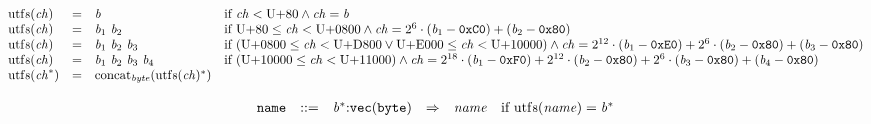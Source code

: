 \vspace{1ex}

$$
\begin{array}{@{}lcl@{}l@{}}
{\mathrm{utf{\scriptstyle8}}}({\mathit{ch}}) &=& {\mathit{b}} &\quad
  \mbox{if}~{\mathit{ch}} < \mathrm{U{+}80} \land {\mathit{ch}} = {\mathit{b}} \\
{\mathrm{utf{\scriptstyle8}}}({\mathit{ch}}) &=& {\mathit{b}}_{{1}}~{\mathit{b}}_{{2}} &\quad
  \mbox{if}~\mathrm{U{+}80} \leq {\mathit{ch}} < \mathrm{U{+}0800} \land {\mathit{ch}} = {2^{6}} \cdot ({\mathit{b}}_{{1}} - \mathtt{0xC0}) + ({\mathit{b}}_{{2}} - \mathtt{0x80}) \\
{\mathrm{utf{\scriptstyle8}}}({\mathit{ch}}) &=& {\mathit{b}}_{{1}}~{\mathit{b}}_{{2}}~{\mathit{b}}_{{3}} &\quad
  \mbox{if}~(\mathrm{U{+}0800} \leq {\mathit{ch}} < \mathrm{U{+}D800} \lor \mathrm{U{+}E000} \leq {\mathit{ch}} < \mathrm{U{+}10000}) \land {\mathit{ch}} = {2^{12}} \cdot ({\mathit{b}}_{{1}} - \mathtt{0xE0}) + {2^{6}} \cdot ({\mathit{b}}_{{2}} - \mathtt{0x80}) + ({\mathit{b}}_{{3}} - \mathtt{0x80}) \\
{\mathrm{utf{\scriptstyle8}}}({\mathit{ch}}) &=& {\mathit{b}}_{{1}}~{\mathit{b}}_{{2}}~{\mathit{b}}_{{3}}~{\mathit{b}}_{{4}} &\quad
  \mbox{if}~(\mathrm{U{+}10000} \leq {\mathit{ch}} < \mathrm{U{+}11000}) \land {\mathit{ch}} = {2^{18}} \cdot ({\mathit{b}}_{{1}} - \mathtt{0xF0}) + {2^{12}} \cdot ({\mathit{b}}_{{2}} - \mathtt{0x80}) + {2^{6}} \cdot ({\mathit{b}}_{{3}} - \mathtt{0x80}) + ({\mathit{b}}_{{4}} - \mathtt{0x80}) \\
{\mathrm{utf{\scriptstyle8}}}({{\mathit{ch}}^\ast}) &=& {{\mathrm{concat}}}_{{\mathit{byte}}}({{\mathrm{utf{\scriptstyle8}}}({\mathit{ch}})^\ast}) &  \\
\end{array}
$$

$$
\begin{array}{@{}l@{}rrlll@{}l@{}}
& {\mathtt{name}} &::=& {{\mathit{b}}^\ast}{:}{\mathtt{vec}}({\mathtt{byte}}) &\Rightarrow& {\mathit{name}} &\quad
  \mbox{if}~{\mathrm{utf{\scriptstyle8}}}({\mathit{name}}) = {{\mathit{b}}^\ast} \\
\end{array}
$$

\vspace{1ex}


